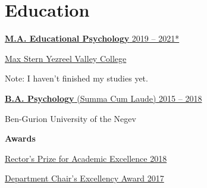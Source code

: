 \documentclass[
	12pt,a4paper %
]{article}
\begin{document}

\section{Education}
\href{https://loona-il.000webhostapp.com/resume-references/edu-psy-ma.pdf}{\textbf{\large M.A. Educational Psychology} \hfill 2019 -- 2021*}

\href{https://loona-il.000webhostapp.com/resume-references/edu-psy-ma.pdf}{\noindent Max Stern Yezreel Valley College}

\small Note: I haven't finished my studies yet.

\noindent\dotfill %

\noindent\href{https://loona-il.000webhostapp.com/resume-references/BA-and-honorary.pdf}{\large \noindent\textbf{B.A. Psychology} \normalsize{(Summa Cum Laude)} \hfill 2015 -- 2018}

\noindent Ben-Gurion University of the Negev

\noindent\textbf{Awards}

\href{https://loona-il.000webhostapp.com/resume-references/BA-and-honorary.pdf}{Rector’s Prize for Academic Excellence \hfill 2018}

\href{https://loona-il.000webhostapp.com/resume-references/BA-and-honorary.pdf}{Department Chair’s Excellency Award \hfill 2017}
\end{document}
